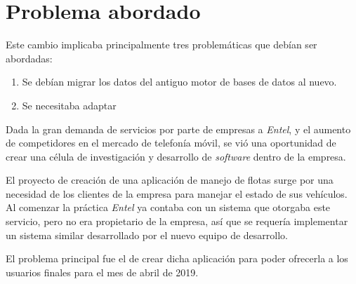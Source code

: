 \section{Problema abordado}
  Este cambio implicaba principalmente tres problemáticas que debían ser abordadas:
      
  \begin{enumerate}
    \item Se debían migrar los datos del antiguo motor de bases de datos\autocite{firebase} al 
      nuevo.
    \item Se necesitaba adaptar 
  \end{enumerate}
  Dada la gran demanda de servicios por parte de empresas a \textit{Entel}, y el aumento
  de competidores en el mercado de telefonía móvil, se vió una oportunidad de crear una
  célula de investigación y desarrollo de \textit{software} dentro de la empresa.

  El proyecto de creación de una aplicación de manejo de flotas surge por una necesidad de
  los clientes de la empresa para manejar el estado de sus vehículos.
  Al comenzar la práctica \textit{Entel} ya contaba con un sistema que otorgaba este
  servicio, pero no era propietario de la empresa, así que se requería implementar un
  sistema similar desarrollado por el nuevo equipo de desarrollo.

  El problema principal fue el de crear dicha aplicación para poder ofrecerla a los
  usuarios finales para el mes de abril de 2019.
%